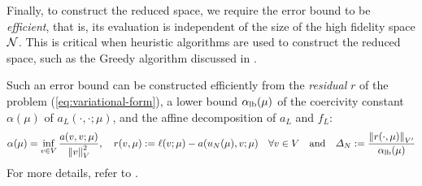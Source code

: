 Finally, to construct the reduced space, we require the error bound to be \emph{efficient}, that is, its evaluation is independent of the size of the high fidelity space $\mathcal{N}$.
This is critical when heuristic algorithms are used to construct the reduced space, such as the Greedy algorithm discussed in .

Such an error bound can be constructed efficiently from the \emph{residual} $r$ of the problem (\ref{eq:variational-form}),
a lower bound $\alpha_{\mathrm{lb}}(\mu)$ of the coercivity constant $\alpha(\mu)$ of $a_L(\cdot, \cdot; \mu)$, and the affine decomposition of $a_L$ and $f_L$:
\begin{equation}
    \alpha(\mu) = \inf_{v\in V}\frac{a(v, v; \mu)}{\left\Vert v\right\Vert_{V}^2},
    \quad
    r(v, \mu):= \ell(v; \mu) - a(u_N(\mu), v; \mu) \quad \forall v\in V
    \quad\text{and}\quad
    \Delta_N := \dfrac{\left\Vert r(\cdot, \mu)\right\Vert_{V'}}{\alpha_{\mathrm{lb}}(\mu)}
\end{equation}
For more details, refer to \cite{10.1115/1.1448332}.
